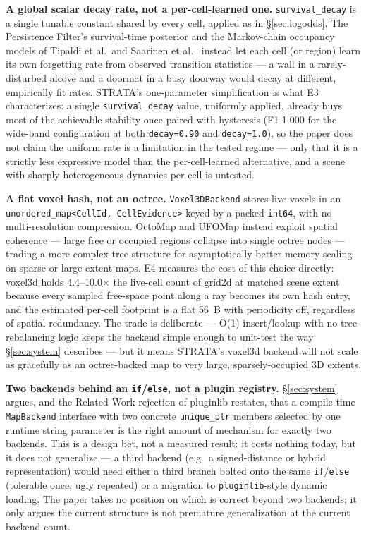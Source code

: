 \documentclass[conference]{IEEEtran}
\begin{document}
\textbf{A global scalar decay rate, not a per-cell-learned one.} \texttt{survival\_decay}
is a single tunable constant shared by every cell, applied as in \S\ref{sec:logodds}. The
Persistence Filter's survival-time posterior \cite{rosen2016persistence} and the
Markov-chain occupancy models of Tipaldi et al.\ and Saarinen et al.\
\cite{tipaldi2013lifelong,saarinen2012imac} instead let each cell (or region)
learn its own forgetting rate from observed transition statistics --- a wall
in a rarely-disturbed alcove and a doormat in a busy doorway would decay at
different, empirically fit rates. STRATA's one-parameter simplification is
what E3 characterizes: a single \texttt{survival\_decay} value, uniformly applied,
already buys most of the achievable stability once paired with hysteresis
(F1 1.000 for the wide-band configuration at both \texttt{decay=0.90} and
\texttt{decay=1.0}), so the paper does not claim the uniform rate is a limitation
in the tested regime --- only that it is a strictly less expressive model
than the per-cell-learned alternative, and a scene with sharply
heterogeneous dynamics per cell is untested.

\textbf{A flat voxel hash, not an octree.} \texttt{Voxel3DBackend} stores live voxels in
an \texttt{unordered\_map<CellId, CellEvidence>} keyed by a packed \texttt{int64}, with no
multi-resolution compression. OctoMap \cite{hornung2013octomap} and UFOMap
\cite{duberg2020ufomap} instead exploit spatial coherence --- large free or
occupied regions collapse into single octree nodes --- trading a more complex
tree structure for asymptotically better memory scaling on sparse or
large-extent maps. E4 measures the cost of this choice directly: voxel3d
holds 4.4--10.0$\times$ the live-cell count of grid2d at matched scene extent because
every sampled free-space point along a ray becomes its own hash entry, and
the estimated per-cell footprint is a flat 56~B with periodicity off,
regardless of spatial redundancy. The trade
is deliberate --- O(1) insert/lookup with no tree-rebalancing logic keeps the
backend simple enough to unit-test the way \S\ref{sec:system} describes --- but it means
STRATA's voxel3d backend will not scale as gracefully as an octree-backed
map to very large, sparsely-occupied 3D extents.

\textbf{Two backends behind an \texttt{if}/\texttt{else}, not a plugin registry.} \S\ref{sec:system} argues,
and the Related Work rejection of pluginlib \cite{ros2pluginlib} restates, that
a compile-time \texttt{MapBackend} interface with two concrete \texttt{unique\_ptr} members
selected by one runtime string parameter is the right amount of mechanism
for exactly two backends. This is a design bet, not a measured result: it
costs nothing today, but it does not generalize --- a third backend (e.g.\ a
signed-distance or hybrid representation) would need either a third branch
bolted onto the same \texttt{if}/\texttt{else} (tolerable once, ugly repeated) or a
migration to \texttt{pluginlib}-style dynamic loading. The paper takes no position
on which is correct beyond two backends; it only argues the current
structure is not premature generalization at the current backend count.
\end{document}
